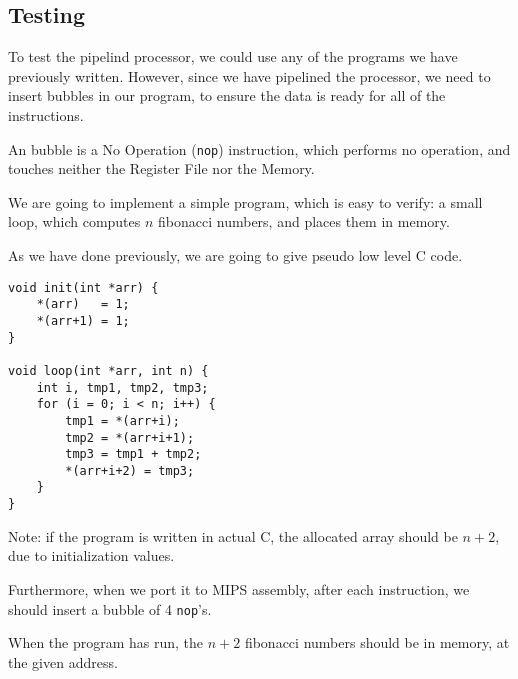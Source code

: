 \documentclass{beamer}
\begin{document}
\subsection{Testing}
\begin{frame}
    To test the pipelind processor, we could use any of the programs we have
    previously written. However, since we have pipelined the processor, we
    need to insert bubbles in our program, to ensure the data is ready for all
    of the instructions.

    \vspace{\baselineskip}
    An bubble is a No Operation (\texttt{nop}) instruction, which performs no
    operation, and touches neither the Register File nor the Memory.
\end{frame}
\begin{frame}
    We are going to implement a simple program, which is easy to verify: a
    small loop, which computes $n$ fibonacci numbers, and places them in
    memory.

    \vspace{\baselineskip}
    As we have done previously, we are going to give pseudo low level C code.
\end{frame}
\begin{frame}[fragile]
\begin{lstlisting}
void init(int *arr) {
    *(arr)   = 1;
    *(arr+1) = 1;
}

void loop(int *arr, int n) {
    int i, tmp1, tmp2, tmp3;
    for (i = 0; i < n; i++) {
        tmp1 = *(arr+i);
        tmp2 = *(arr+i+1);
        tmp3 = tmp1 + tmp2;
        *(arr+i+2) = tmp3;
    }
}
\end{lstlisting}
\end{frame}
\begin{frame}
    Note: if the program is written in actual C, the allocated array should be
    $n+2$, due to initialization values.

    \vspace{\baselineskip}
    Furthermore, when we port it to MIPS assembly, after each instruction, we
    should insert a bubble of 4 \texttt{nop}'s.

    \vspace{\baselineskip}
    When the program has run, the $n+2$ fibonacci numbers should be in memory,
    at the given address.
\end{frame}


\AtBeginSection{}
\section*{}

%  
%  
\end{document}
